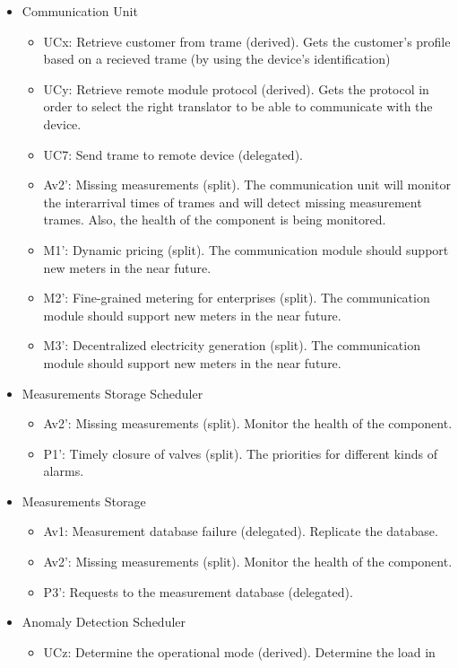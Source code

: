 \begin{itemize}
	\item Communication Unit
	\begin{itemize}
	  	\item UCx: Retrieve customer from trame (derived). Gets the customer's
	  	profile based on a recieved trame (by using the device's identification)
	  	\item UCy: Retrieve remote module protocol (derived). Gets the protocol in
	  	order to select the right translator to be able to communicate with the device. 
		\item UC7: Send trame to remote device (delegated). 
		\item Av2': Missing measurements (split). The communication unit will monitor
		the interarrival times of trames and will detect missing measurement trames.
		Also, the health of the component is being monitored.
		\item M1': Dynamic pricing (split). The communication module should support
		new meters in the near future. 
		\item M2': Fine-grained metering for enterprises (split). The communication
		module should support new meters in the near future. 
		\item M3': Decentralized electricity generation (split). The communication
		module should support new meters in the near future. 
	\end{itemize}
	\item Measurements Storage Scheduler
	\begin{itemize}
		\item Av2': Missing measurements (split). Monitor the health of the component.
		\item P1': Timely closure of valves (split). The priorities for different
		kinds of alarms.
	\end{itemize}
	\item Measurements Storage
	\begin{itemize}
		\item Av1: Measurement database failure (delegated). Replicate the database.
		\item Av2': Missing measurements (split). Monitor the health of the component.
	  	\item P3': Requests to the measurement database (delegated). 
	\end{itemize}
	\item Anomaly Detection Scheduler
	\begin{itemize}
		\item UCz: Determine the operational mode (derived). Determine the load in

\end{itemize}
\end{itemize}
